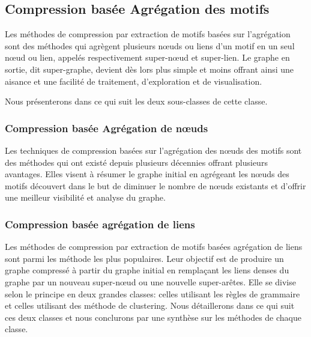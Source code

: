 \documentclass[a4paper,oneside,12pt]{report}
\theoremstyle{definition}
\begin{document}
				
				\subsection{Compression basée Agrégation des motifs}
				
					Les méthodes de compression par extraction de motifs basées sur l'agrégation sont des méthodes   qui agrègent plusieurs nœuds ou liens d'un motif en un seul nœud ou lien, appelés respectivement super-nœud et super-lien. Le graphe en sortie, dit super-graphe, devient dès lors plus simple et moins offrant ainsi une aisance et une facilité de traitement, d'exploration et de visualisation. 
					
					Nous présenterons dans ce qui suit les deux sous-classes de cette classe. 
					
					 
					\subsubsection{Compression basée Agrégation de nœuds}
					
					Les techniques de compression basées sur l'agrégation des nœuds des motifs sont des méthodes qui ont existé depuis plusieurs décennies offrant plusieurs avantages. 
					Elles visent à résumer le graphe initial en agrégeant les nœuds des motifs découvert dans le but de diminuer le nombre de nœuds existants  et d'offrir une meilleur visibilité et analyse du graphe. 
						
						
						
						
						
					\subsubsection{Compression basée agrégation de liens}
						Les méthodes de compression par extraction de motifs basées agrégation de liens sont parmi les méthode les plus populaires. Leur objectif est de produire un graphe compressé à partir du graphe initial en remplaçant les liens denses du graphe par un nouveau super-nœud ou une nouvelle super-arêtes. Elle se divise selon le principe en deux grandes classes: celles utilisant les règles de grammaire et celles utilisant des méthode de clustering. Nous détaillerons dans ce qui suit ces deux classes et nous conclurons par une synthèse sur les méthodes de chaque classe.
						
\end{document}
